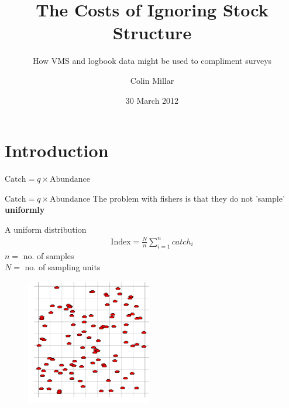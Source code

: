 \documentclass{beamer}
\title{The Costs of Ignoring Stock Structure}
\subtitle{How VMS and logbook data might be used to compliment surveys}
\author[CP Millar]{Colin Millar}
\institute[JRC]{European Commission\\ Joint Research Center}
\date[Sketch 2012]{30 March 2012}
\begin{document}


\begin{frame}
\titlepage
\end{frame}

\section{Introduction}
\label{sec:introduction}

\begin{frame}
\begin{center}
\LARGE \textbf{$\text{Catch} = q \times \text{Abundance}$}
\end{center}
\end{frame}

\begin{frame}{$\text{Catch} = q \times \text{Abundance}$}
The problem with fishers is that they do not 'sample' \textbf{uniformly}\\
\begin{minipage}{0.4\textwidth}
  \begin{flushleft}
    A uniform distribution
    \begin{align*}
      \text{Index} = \frac{N}{n} \sum_{i=1}^n catch_i    
    \end{align*}
    $n =$ no. of samples \\
    $N =$ no. of sampling units
  \end{flushleft}
\end{minipage}
\hspace{0.5cm}
\begin{minipage}{0.4\textwidth}
  \begin{figure}
    \centering
    \includegraphics[width=5.5cm]{fig1}
  \end{figure}
\end{minipage}

\end{frame}
\end{document}
